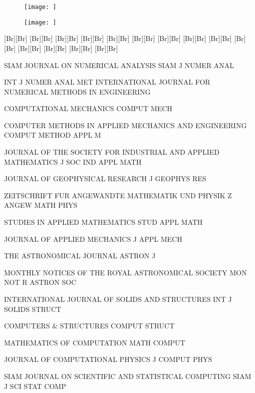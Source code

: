 {\begin{figure}
    \begin{minipage}[t]{0.5\textwidth}
    \centering
    \texttt{[image: ]}
    \caption{}
    \label{}
    \end{minipage}%
    \begin{minipage}[t]{0.5\textwidth}
    \centering
    \texttt{[image: ]}
    \caption{}
    \label{}
    \end{minipage}%
\end{figure}

    \psfrag{} [Br][Br]{\small $$}%
    \psfrag{} [Br][Br]{\small $$}%
    \psfrag{} [Br][Br]{\small $$}%
    \psfrag{} [Br][Br]{\small $$}%
    \psfrag{} [Br][Br]{\small $$}%
    \psfrag{} [Br][Br]{\small $$}%
    \psfrag{} [Br][Br]{\small $$}%
    \psfrag{} [Br][Br]{\small $$}%
    \psfrag{} [Br][Br]{\small $$}%
    \psfrag{} [Br][Br]{\small $$}%
    \psfrag{} [Br][Br]{\small $$}%
    \psfrag{} [Br][Br]{\small $$}%
    \psfrag{} [Br][Br]{\small $$}%
    \psfrag{} [Br][Br]{\small $$}%


    SIAM JOURNAL ON NUMERICAL ANALYSIS
SIAM J NUMER ANAL

    INT J NUMER ANAL MET
INTERNATIONAL JOURNAL FOR NUMERICAL METHODS IN ENGINEERING

COMPUTATIONAL MECHANICS
    COMPUT MECH

COMPUTER METHODS IN APPLIED MECHANICS AND ENGINEERING
    COMPUT METHOD APPL M

JOURNAL OF THE SOCIETY FOR INDUSTRIAL AND APPLIED MATHEMATICS
    J SOC IND APPL MATH

JOURNAL OF GEOPHYSICAL RESEARCH
    J GEOPHYS RES

ZEITSCHRIFT FUR ANGEWANDTE MATHEMATIK UND PHYSIK
    Z ANGEW MATH PHYS

STUDIES IN APPLIED MATHEMATICS
    STUD APPL MATH

JOURNAL OF APPLIED MECHANICS
    J APPL MECH

THE ASTRONOMICAL JOURNAL
    ASTRON J

MONTHLY NOTICES OF THE ROYAL ASTRONOMICAL SOCIETY
    MON NOT R ASTRON SOC

INTERNATIONAL JOURNAL OF SOLIDS AND STRUCTURES
    INT J SOLIDS STRUCT

COMPUTERS & STRUCTURES
    COMPUT STRUCT

MATHEMATICS OF COMPUTATION
    MATH COMPUT

JOURNAL OF COMPUTATIONAL PHYSICS
    J COMPUT PHYS

SIAM JOURNAL ON SCIENTIFIC AND STATISTICAL COMPUTING
    SIAM J SCI STAT COMP

}

